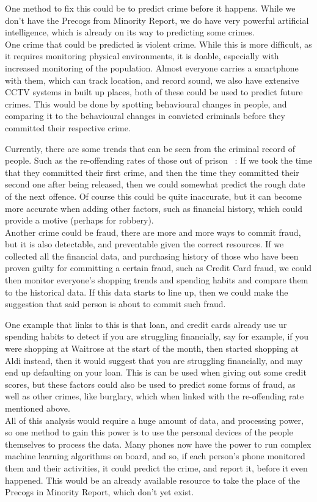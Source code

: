 
One method to fix this could be to predict crime before it happens.
While we don't have the Precogs from Minority Report, we do have very powerful artificial intelligence, which is
already on its way to predicting some crimes.
\\

One crime that could be predicted is violent crime.
While this is more difficult, as it requires monitoring physical environments, it is doable, especially with
increased monitoring of the population.
Almost everyone carries a smartphone with them, which can track location, and record sound, we also have extensive
CCTV systems in built up places, both of these could be used to predict future crimes.
This would be done by spotting behavioural changes in people, and comparing it to the behavioural changes in
convicted criminals before they committed their respective crime.

Currently, there are some trends that can be seen from the criminal record of people.
Such as the re-offending rates of those out of prison ~\cite{dci-walker}: If we took the time that they committed
their first crime, and then the time they committed their second one after being released, then we could somewhat
predict the rough date of the next offence.
Of course this could be quite inaccurate, but it can become more accurate when adding other factors, such as
financial history, which could provide a motive (perhaps for robbery).
\\

Another crime could be fraud, there are more and more ways to commit fraud, but it is also detectable, and preventable
given the correct resources.
If we collected all the financial data, and purchasing history of those who have been proven guilty for
committing a certain fraud, such as Credit Card fraud, we could then monitor everyone's shopping trends and spending
habits and compare them to the historical data.
If this data starts to line up, then we could make the suggestion that said person is about to commit such fraud.

One example that links to this is that loan, and credit cards already use ur spending habits to detect if you are
struggling financially, say for example, if you were shopping at Waitrose at the start of the month, then started
shopping at Aldi instead, then it would suggest that you are struggling financially, and may end up defaulting on
your loan.
This is can be used when giving out some credit scores, but these factors could also be used to predict some forms
of fraud, as well as other crimes, like burglary, which when linked with the re-offending rate mentioned above.
\\

All of this analysis would require a huge amount of data, and processing power, so one method to gain this power
is to use the personal devices of the people themselves to process the data.
Many phones now have the power to run complex machine learning algorithms on board, and so, if each person's phone
monitored them and their activities, it could predict the crime, and report it, before it even happened.
This would be an already available resource to take the place of the Precogs in Minority Report, which don't yet
exist.